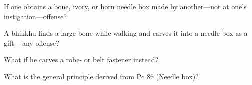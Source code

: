 If one obtains a bone, ivory, or horn needle box made by another—not at one’s instigation—offense?

\bigskip


A bhikkhu finds a large bone while walking and carves it into a needle box as a gift – any offense?

\bigskip


What if he carves a robe- or belt fastener instead?

\bigskip


What is the general principle derived from Pc 86 (Needle box)?


